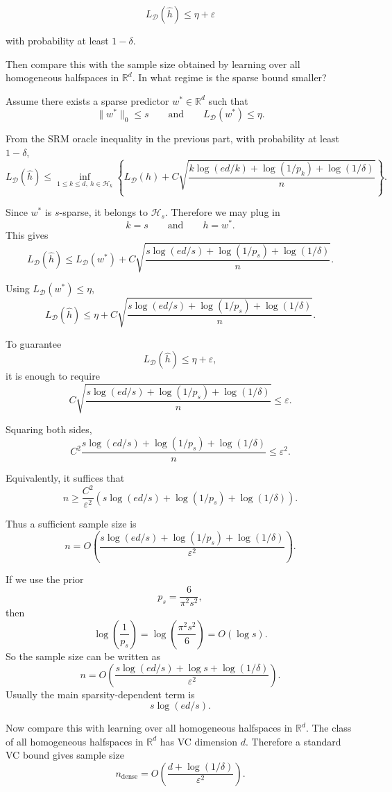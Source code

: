 \documentclass[11pt]{article}
\newcommand{\calD}{\mathcal{D}}
\newcommand{\calH}{\mathcal{H}}
\begin{document}
\[
L_{\mathcal{D}}(\hat{h}) \le \eta + \varepsilon
\]


with probability at least $1 - \delta$.

Then compare this with the sample size obtained by learning over all homogeneous 
halfspaces in $\mathbb{R}^d$. In what regime is the sparse bound smaller?

\begin{solutionbox}

Assume there exists a sparse predictor $w^\ast\in\mathbb R^d$ such that
\[
\|w^\ast\|_0\le s
\qquad\text{and}\qquad
L_{\calD}(w^\ast)\le \eta.
\]

From the SRM oracle inequality in the previous part, with probability at least $1-\delta$,
\[
L_{\calD}(\hat h)
\le
\inf_{1\le k\le d,\ h\in\calH_k}
\left\{
L_{\calD}(h)
+
C\sqrt{
\frac{
k\log(ed/k)+\log(1/p_k)+\log(1/\delta)
}{n}
}
\right\}.
\]

Since $w^\ast$ is $s$-sparse, it belongs to $\calH_s$. Therefore we may plug in
\[
k=s
\qquad\text{and}\qquad
h=w^\ast.
\]
This gives
\[
L_{\calD}(\hat h)
\le
L_{\calD}(w^\ast)
+
C\sqrt{
\frac{
s\log(ed/s)+\log(1/p_s)+\log(1/\delta)
}{n}
}.
\]

Using $L_{\calD}(w^\ast)\le \eta$,
\[
L_{\calD}(\hat h)
\le
\eta
+
C\sqrt{
\frac{
s\log(ed/s)+\log(1/p_s)+\log(1/\delta)
}{n}
}.
\]

To guarantee
\[
L_{\calD}(\hat h)\le \eta+\varepsilon,
\]
it is enough to require
\[
C\sqrt{
\frac{
s\log(ed/s)+\log(1/p_s)+\log(1/\delta)
}{n}
}
\le
\varepsilon.
\]

Squaring both sides,
\[
C^2
\frac{
s\log(ed/s)+\log(1/p_s)+\log(1/\delta)
}{n}
\le
\varepsilon^2.
\]

Equivalently, it suffices that
\[
n
\ge
\frac{C^2}{\varepsilon^2}
\left(
s\log(ed/s)+\log(1/p_s)+\log(1/\delta)
\right).
\]

Thus a sufficient sample size is
\[
\boxed{
n
=
O\!\left(
\frac{
s\log(ed/s)+\log(1/p_s)+\log(1/\delta)
}{\varepsilon^2}
\right).
}
\]

If we use the prior
\[
p_s=\frac{6}{\pi^2s^2},
\]
then
\[
\log\left(\frac{1}{p_s}\right)
=
\log\left(\frac{\pi^2s^2}{6}\right)
=
O(\log s).
\]
So the sample size can be written as
\[
\boxed{
n
=
O\!\left(
\frac{
s\log(ed/s)+\log s+\log(1/\delta)
}{\varepsilon^2}
\right).
}
\]
Usually the main sparsity-dependent term is
\[
s\log(ed/s).
\]

Now compare this with learning over all homogeneous halfspaces in $\mathbb R^d$. The class of all homogeneous halfspaces in $\mathbb R^d$ has VC dimension $d$. Therefore a standard VC bound gives sample size
\[
\boxed{
n_{\mathrm{dense}}
=
O\!\left(
\frac{
d+\log(1/\delta)
}{\varepsilon^2}
\right).
}
\]


\end{solutionbox}
\end{document}
